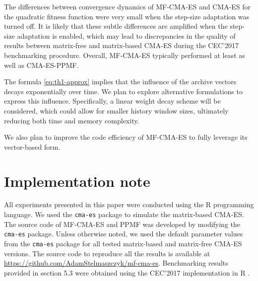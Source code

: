 \documentclass[dvipsnames,format=sigconf,anonymous=false,review=false]{acmart}
\begin{document}



The differences between convergence dynamics of MF-CMA-ES and CMA-ES for the quadratic fitness function were very small when the step-size adaptation was turned off. It is likely that these subtle differences are amplified when the step-size adaptation is enabled, which may lead to discrepancies in the quality of results between matrix-free and matrix-based CMA-ES during the CEC'2017 benchmarking procedure. Overall, MF-CMA-ES typically performed at least as well as CMA-ES-PPMF.

The formula \eqref{eq:th1-approx} implies that the influence of the archive vectors decays exponentially over time. We plan to explore alternative formulations to express this influence. Specifically, a linear weight decay scheme will be considered, which could allow for smaller history window sizes, ultimately reducing both time and memory complexity.

We also plan to improve the code efficiency of MF-CMA-ES to fully leverage its vector-based form. 

\section*{Implementation note}

All experiments presented in this paper were conducted using the R programming language. 
We used the {\tt cma-es} package \cite{cmaes-package} to simulate the matrix-based CMA-ES. The source code of MF-CMA-ES and PPMF was developed by modifying the {\tt cma-es} package. Unless otherwise noted, we used the default parameter values from the {\tt cma-es} package for all tested matrix-based and matrix-free CMA-ES versions. The source code to reproduce all the results is available at \href{https://github.com/AdamStelmaszczyk/mf-cma-es}{https://github.com/AdamStelmaszczyk/mf-cma-es}. Benchmarking results provided in section 5.3 were obtained using the CEC'2017 implementation in R \cite{cecs-package}.

\clearpage


\end{document}
